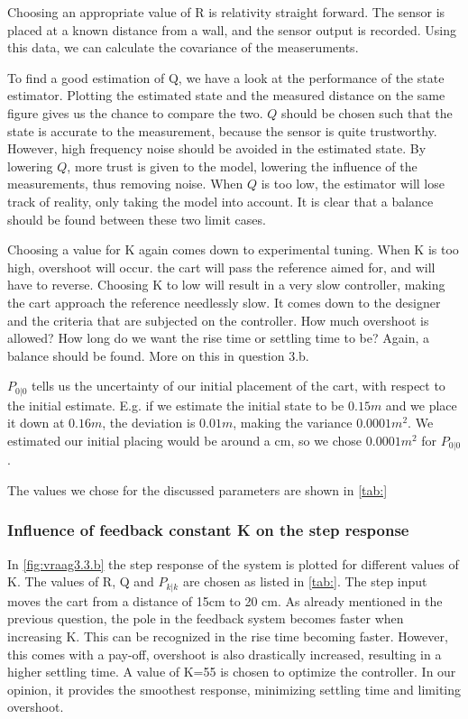 \documentclass[a4paper]{article}
\newcommand{\newpar}{\vspace{.3cm}\noindent}
\begin{document}
\newpar
Choosing an appropriate value of R is relativity straight forward. The sensor is placed at a known distance from a wall, and the sensor output is recorded. Using this data, we can calculate the covariance of the measeruments.

\newpar
To find a good estimation of Q, we have a look at the performance of the state estimator. Plotting the estimated state and the measured distance on the same figure gives us the chance to compare the two. $Q$ should be chosen such that the state is accurate to the measurement, because the sensor is quite trustworthy. However, high frequency noise should be avoided in the estimated state. By lowering $Q$, more trust is given to the model, lowering the influence of the measurements, thus removing noise. When $Q$ is too low, the estimator will lose track of reality, only taking the model into account. It is clear that a balance should be found between these two limit cases.

\newpar
Choosing a value for K again comes down to experimental tuning. When K is too high, overshoot will occur. the cart will pass the reference aimed for, and will have to reverse. Choosing K to low will result in a very slow controller, making the cart approach the reference needlessly slow. It comes down to the designer and the criteria that are subjected on the controller. How much overshoot is allowed? How long do we want the rise time or settling time to be? Again, a balance should be found. More on this in question 3.b. 

\newpar
$P_{0|0}$ tells us the uncertainty of our initial placement of the cart, with respect to the initial estimate. E.g. if we estimate the initial state to be $0.15m$ and we place it down at $0.16m$, the deviation is $0.01m$, making the variance $0.0001m^2$. We estimated our initial placing would be around a cm, so we chose $0.0001m^2$ for $P_{0|0}$.

\newpar
The values we chose for the discussed parameters are shown in \autoref{tab:}


\subsubsection{Influence of feedback constant K on the step response}
In \autoref{fig:vraag3.3.b} the step response of the system is plotted for different values of K. The values of R, Q and $P_{k|k}$ are chosen as listed in \autoref{tab:}. The step input moves the cart from a distance of 15cm to 20 cm. As already mentioned in the previous question, the pole in the feedback system becomes faster when increasing K. This can be recognized in the rise time becoming faster. However, this comes with a pay-off, overshoot is also drastically increased, resulting in a higher settling time. A value of K=55 is chosen to optimize the controller. In our opinion, it provides the smoothest response, minimizing settling time and limiting overshoot.
\end{document}
